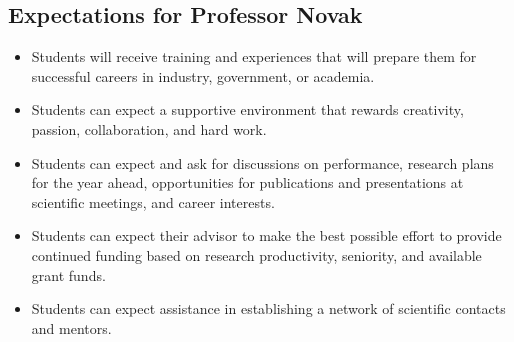\documentclass[12pt,twoside]{article}
\begin{document}
\begin{center}
\section*{Expectations for Professor Novak}
\end{center}

\begin{itemize}
\item Students will receive training and experiences that will prepare them for successful careers in industry, government, or academia.
\item Students can expect a supportive environment that rewards creativity, passion, collaboration, and hard work.
\item Students can expect and ask for discussions on performance, research plans for the year ahead, opportunities for publications and presentations at scientific meetings, and career interests.
\item Students can expect their advisor to make the best possible effort to provide continued funding based on research productivity, seniority, and available grant funds.
\item Students can expect assistance in establishing a network of scientific contacts and mentors.
\end{itemize}
\end{document}
